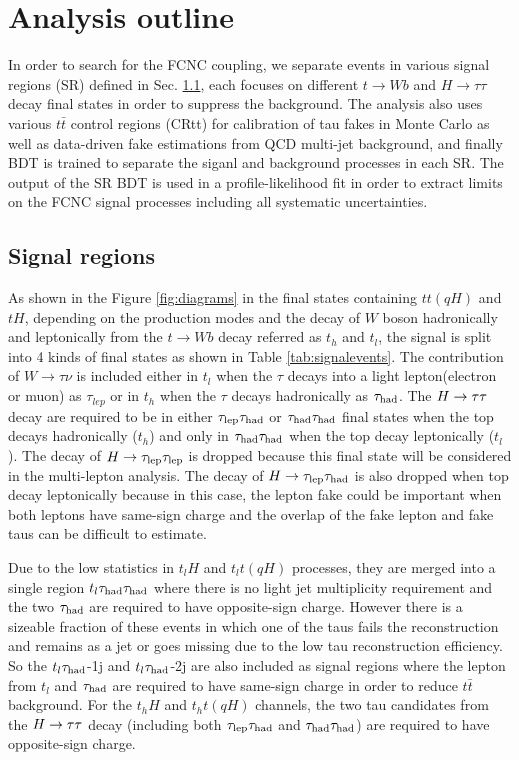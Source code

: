

\section{Analysis outline}

In order to search for the FCNC coupling, we separate events in various signal regions (SR) defined in Sec. \ref{sec:SRs}, each focuses on
different $t\to Wb$ and $H\to\tau\tau$ decay final states in order to suppress the background.
The analysis also uses various $t\bar{t}$ control regions (CRtt) for calibration of tau fakes in Monte Carlo as well as
data-driven fake estimations from QCD multi-jet background, and finally BDT is trained to separate the
siganl and background processes in each SR. The output of
the SR BDT is used in a profile-likelihood fit in order to extract limits on the FCNC signal processes including all systematic uncertainties.

\subsection{Signal regions}
\label{sec:SRs}
As shown in the Figure \ref{fig:diagrams} in the final states containing $tt(qH)$ and $tH$, depending on the production modes and
the decay of $W$ boson hadronically and leptonically from the $t\to Wb$ decay referred as $t_h$ and $t_l$,
the signal is split into 4 kinds of final states as shown in Table \ref{tab:signalevents}. The contribution of $W\rightarrow\tau\nu$ is included either in 
$t_l$ when the $\tau$ decays into a light lepton(electron or muon) as $\tau_{lep}$ or in $t_h$ when the $\tau$ decays hadronically as $\tau_\text{had}$. 
 The $H \rightarrow \tau\tau$ decay are required to be in either $\tau_\text{lep}{}\tau_\text{had}$ or $\tau_\text{had}{}\tau_\text{had}$ final states when the top decays hadronically ($t_h$) and only in $\tau_\text{had}{}\tau_\text{had}$ when the top decay leptonically ($t_l$). The decay of $H\to\tau_\text{lep}{}\tau_\text{lep}$ is dropped because this final state will be considered in the multi-lepton analysis. The decay of $H\to\tau_\text{lep}{}\tau_\text{had}$ is also dropped when top decay leptonically because in this case, the lepton fake could be important when both leptons have same-sign charge
and the overlap of the fake lepton and fake taus can be difficult to estimate.

Due to the low statistics in $t_lH$ and $t_lt(qH)$ processes, they are merged into a single region $t_l\tau_\text{had}{}\tau_\text{had}$ where there is no light jet multiplicity requirement and the two $\tau_\text{had}$ are required to have opposite-sign charge. However there is a sizeable fraction of these events in which one of the taus fails the reconstruction and remains as a jet or goes missing due to
the low tau reconstruction efficiency. So the $t_l\tau_\text{had}$-1j and $t_l\tau_\text{had}$-2j are also included as signal regions where the lepton from $t_l$ and $\tau_\text{had}$ are required to have same-sign
charge in order to reduce $t\bar t$ background. For the $t_hH$ and $t_ht(qH)$ channels, the two tau candidates from the $H \rightarrow \tau\tau$ decay (including both $\tau_\text{lep}{}\tau_\text{had}$ and $\tau_\text{had}{}\tau_\text{had}$) are required to have opposite-sign charge.  

